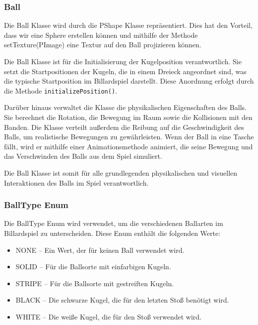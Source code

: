 \documentclass[a4paper,12pt]{article}
\begin{document}
	
	
	
	\subsubsection{Ball}
	
	Die Ball Klasse wird durch die PShape Klasse repräsentiert. Dies hat den Vorteil, dass wir eine Sphere erstellen können und mithilfe der Methode setTexture(PImage) eine Textur auf den Ball projizieren können.
	
	Die Ball Klasse ist für die Initialisierung der Kugelposition verantwortlich. Sie setzt die Startpositionen der Kugeln, die in einem Dreieck angeordnet sind, was die typische Startposition im Billardspiel darstellt. Diese Anordnung erfolgt durch die Methode \texttt{initializePosition()}. 
	
	Darüber hinaus verwaltet die Klasse die physikalischen Eigenschaften des Balls. Sie berechnet die Rotation, die Bewegung im Raum sowie die Kollisionen mit den Banden. Die Klasse verteilt außerdem die Reibung auf die Geschwindigkeit des Balls, um realistische Bewegungen zu gewährleisten. Wenn der Ball in eine Tasche fällt, wird er mithilfe einer Animationsmethode animiert, die seine Bewegung und das Verschwinden des Balls aus dem Spiel simuliert.
	
	Die Ball Klasse ist somit für alle grundlegenden physikalischen und visuellen Interaktionen des Balls im Spiel verantwortlich.
	
	
	\subsubsection{BallType Enum}


	Die BallType Enum wird verwendet, um die verschiedenen Ballarten im Billardspiel zu unterscheiden. Diese Enum enthält die folgenden Werte:
	
	\begin{itemize}
		\item NONE – Ein Wert, der für keinen Ball verwendet wird.
		\item SOLID – Für die Ballsorte mit einfarbigen Kugeln.
		\item STRIPE – Für die Ballsorte mit gestreiften Kugeln.
		\item BLACK – Die schwarze Kugel, die für den letzten Stoß benötigt wird.
		\item WHITE – Die weiße Kugel, die für den Stoß verwendet wird.
	\end{itemize}
	
\end{document}
